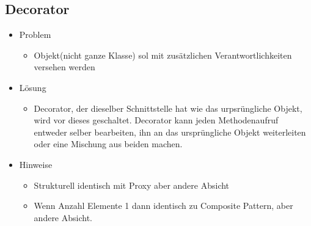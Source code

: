 \documentclass[../ZF_SWEN1.tex]{subfiles}
\begin{document}
\subsection{Decorator}
\begin{itemize}
	\item Problem
	\begin{itemize}
		\item Objekt(nicht ganze Klasse) sol mit zusätzlichen Verantwortlichkeiten versehen werden
	\end{itemize}
	\item Lösung
	\begin{itemize}
		\item Decorator, der dieselber Schnittstelle hat wie das urpsrüngliche Objekt, wird vor dieses geschaltet. Decorator kann jeden Methodenaufruf entweder selber bearbeiten, ihn an das ursprüngliche Objekt weiterleiten oder eine Mischung aus beiden machen.
	\end{itemize}
	\item Hinweise
	\begin{itemize}
		\item Strukturell identisch mit Proxy aber andere Absicht
		\item Wenn Anzahl Elemente 1 dann identisch zu Composite Pattern, aber andere Absicht.
	\end{itemize}
\end{itemize}
\end{document}
